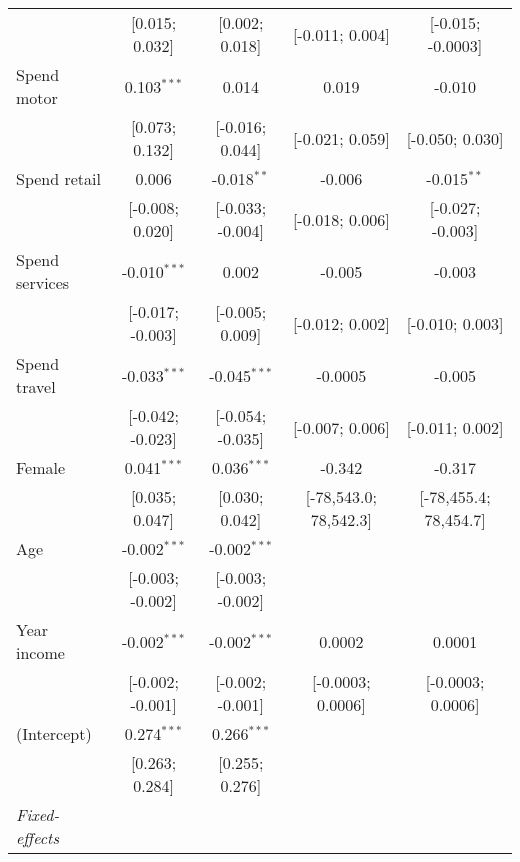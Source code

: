 \begin{table}[htbp]
\begin{threeparttable}[b]
\begin{tabular}{lcccc}
                             & [0.015; 0.032]   & [0.002; 0.018]   & [-0.011; 0.004]       & [-0.015; -0.0003]\\   
         Spend motor         & 0.103$^{***}$    & 0.014            & 0.019                 & -0.010\\   
                             & [0.073; 0.132]   & [-0.016; 0.044]  & [-0.021; 0.059]       & [-0.050; 0.030]\\   
         Spend retail        & 0.006            & -0.018$^{**}$    & -0.006                & -0.015$^{**}$\\   
                             & [-0.008; 0.020]  & [-0.033; -0.004] & [-0.018; 0.006]       & [-0.027; -0.003]\\   
         Spend services      & -0.010$^{***}$   & 0.002            & -0.005                & -0.003\\   
                             & [-0.017; -0.003] & [-0.005; 0.009]  & [-0.012; 0.002]       & [-0.010; 0.003]\\   
         Spend travel        & -0.033$^{***}$   & -0.045$^{***}$   & -0.0005               & -0.005\\   
                             & [-0.042; -0.023] & [-0.054; -0.035] & [-0.007; 0.006]       & [-0.011; 0.002]\\   
         Female              & 0.041$^{***}$    & 0.036$^{***}$    & -0.342                & -0.317\\   
                             & [0.035; 0.047]   & [0.030; 0.042]   & [-78,543.0; 78,542.3] & [-78,455.4; 78,454.7]\\   
         Age                 & -0.002$^{***}$   & -0.002$^{***}$   &                       &   \\   
                             & [-0.003; -0.002] & [-0.003; -0.002] &                       &   \\   
         Year income         & -0.002$^{***}$   & -0.002$^{***}$   & 0.0002                & 0.0001\\   
                             & [-0.002; -0.001] & [-0.002; -0.001] & [-0.0003; 0.0006]     & [-0.0003; 0.0006]\\   
         (Intercept)         & 0.274$^{***}$    & 0.266$^{***}$    &                       &   \\   
                             & [0.263; 0.284]   & [0.255; 0.276]   &                       &   \\   
         \midrule
         \emph{Fixed-effects}\\

\end{tabular}
\end{threeparttable}
\end{table}
